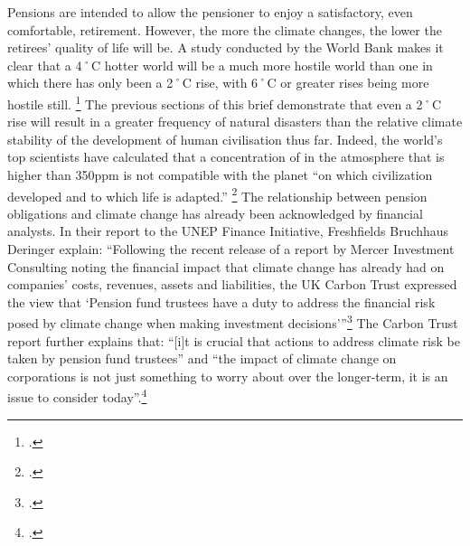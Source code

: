 Pensions are intended to allow the pensioner to enjoy a satisfactory, even comfortable, retirement.
However, the more the climate changes, the lower the retirees' quality of life will be.
A study conducted by the World Bank makes it clear that a 4˚C hotter world will be a much more hostile world than one in which there has only been a 2˚C rise, with 6˚C or greater rises being more hostile still. \footcite{WorldBank4C}
The previous sections of this brief demonstrate that even a 2˚C rise will result in a greater frequency of natural disasters than the relative climate stability of the development of human civilisation thus far.
Indeed, the world's top scientists have calculated that a concentration of  in the atmosphere that is higher than 350ppm is not compatible with the planet ``on which civilization developed and to which life is adapted.'' \footcite{TargetAtmosphere}
The relationship between pension obligations and climate change has already been acknowledged by financial analysts.
In their report to the UNEP Finance Initiative, Freshfields Bruchhaus Deringer explain: ``Following the recent release of a report by Mercer Investment Consulting noting the financial impact that climate change has already had on companies' costs, revenues, assets and liabilities, the UK Carbon Trust expressed the view that `Pension fund trustees have a duty to address the financial risk posed by climate change when making investment decisions'''\footcite[][p. 11]{UNEPFinanceInit}
The Carbon Trust report further explains that: ``[i]t is crucial that actions to address climate risk be taken by pension fund trustees'' and ``the impact of climate change on corporations is not just something to worry about over the longer-term, it is an issue to consider today''.\footcite[][p. 2, 10]{TrusteesGuide}



